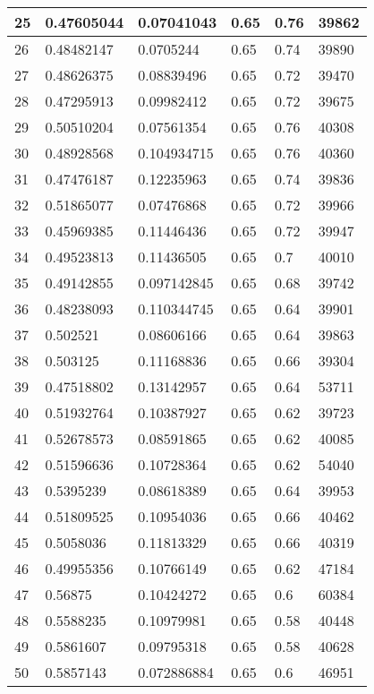 \begin{longtable}{|l|l|l|l|l|l|}
25 & 0.47605044 & 0.07041043 & 0.65 & 0.76 & 39862 \\ \hline 
26 & 0.48482147 & 0.0705244 & 0.65 & 0.74 & 39890 \\ \hline 
27 & 0.48626375 & 0.08839496 & 0.65 & 0.72 & 39470 \\ \hline 
28 & 0.47295913 & 0.09982412 & 0.65 & 0.72 & 39675 \\ \hline 
29 & 0.50510204 & 0.07561354 & 0.65 & 0.76 & 40308 \\ \hline 
30 & 0.48928568 & 0.104934715 & 0.65 & 0.76 & 40360 \\ \hline 
31 & 0.47476187 & 0.12235963 & 0.65 & 0.74 & 39836 \\ \hline 
32 & 0.51865077 & 0.07476868 & 0.65 & 0.72 & 39966 \\ \hline 
33 & 0.45969385 & 0.11446436 & 0.65 & 0.72 & 39947 \\ \hline 
34 & 0.49523813 & 0.11436505 & 0.65 & 0.7 & 40010 \\ \hline 
35 & 0.49142855 & 0.097142845 & 0.65 & 0.68 & 39742 \\ \hline 
36 & 0.48238093 & 0.110344745 & 0.65 & 0.64 & 39901 \\ \hline 
37 & 0.502521 & 0.08606166 & 0.65 & 0.64 & 39863 \\ \hline 
38 & 0.503125 & 0.11168836 & 0.65 & 0.66 & 39304 \\ \hline 
39 & 0.47518802 & 0.13142957 & 0.65 & 0.64 & 53711 \\ \hline 
40 & 0.51932764 & 0.10387927 & 0.65 & 0.62 & 39723 \\ \hline 
41 & 0.52678573 & 0.08591865 & 0.65 & 0.62 & 40085 \\ \hline 
42 & 0.51596636 & 0.10728364 & 0.65 & 0.62 & 54040 \\ \hline 
43 & 0.5395239 & 0.08618389 & 0.65 & 0.64 & 39953 \\ \hline 
44 & 0.51809525 & 0.10954036 & 0.65 & 0.66 & 40462 \\ \hline 
45 & 0.5058036 & 0.11813329 & 0.65 & 0.66 & 40319 \\ \hline 
46 & 0.49955356 & 0.10766149 & 0.65 & 0.62 & 47184 \\ \hline 
47 & 0.56875 & 0.10424272 & 0.65 & 0.6 & 60384 \\ \hline 
48 & 0.5588235 & 0.10979981 & 0.65 & 0.58 & 40448 \\ \hline 
49 & 0.5861607 & 0.09795318 & 0.65 & 0.58 & 40628 \\ \hline 
50 & 0.5857143 & 0.072886884 & 0.65 & 0.6 & 46951 \\ \hline 
\end{longtable}